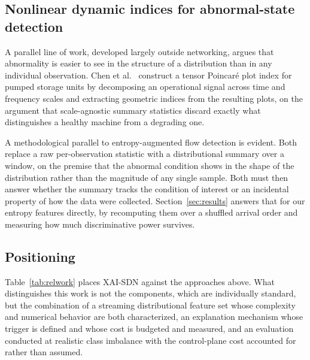 \documentclass{ieeeaccess}
\begin{document}
\subsection{Nonlinear dynamic indices for abnormal-state detection}
A parallel line of work, developed largely outside networking, argues that abnormality is easier to see in the structure of a distribution than in any individual observation. Chen et al.~\cite{chen2025tppi} construct a tensor Poincar\'{e} plot index for pumped storage units by decomposing an operational signal across time and frequency scales and extracting geometric indices from the resulting plots, on the argument that scale-agnostic summary statistics discard exactly what distinguishes a healthy machine from a degrading one.

A methodological parallel to entropy-augmented flow detection is evident. Both replace a raw per-observation statistic with a distributional summary over a window, on the premise that the abnormal condition shows in the shape of the distribution rather than the magnitude of any single sample. Both must then answer whether the summary tracks the condition of interest or an incidental property of how the data were collected. Section~\ref{sec:results} answers that for our entropy features directly, by recomputing them over a shuffled arrival order and measuring how much discriminative power survives.

\subsection{Positioning}
Table~\ref{tab:relwork} places XAI-SDN against the approaches above. What distinguishes this work is not the components, which are individually standard, but the combination of a streaming distributional feature set whose complexity and numerical behavior are both characterized, an explanation mechanism whose trigger is defined and whose cost is budgeted and measured, and an evaluation conducted at realistic class imbalance with the control-plane cost accounted for rather than assumed.
\end{document}
